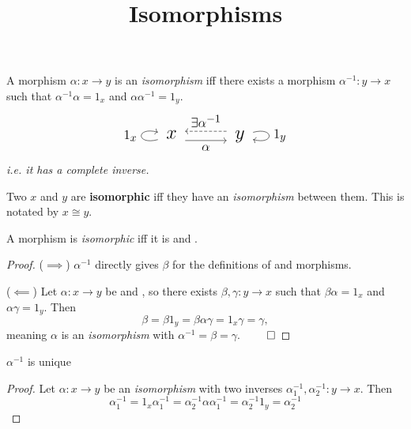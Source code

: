 \documentclass{atomic}
\title{Isomorphisms}
\begin{document}
    \pagestyle{plain}  \noindent
    A morphism $\alpha : x \to y$  is an \textit{isomorphism} iff there exists a morphism $\alpha^{-1} : y \to x$ such that $\alpha^{-1}\alpha = 1_{x}$ and $\alpha\alpha^{-1} = 1_{y}$.
    $$\LARGE\begin{tikzcd}
        \arrow[loop left, "1_x"] x \arrow[r, shift right, swap, "\alpha"] & y \arrow[l, shift right, swap, dashed, "\exists \alpha^{-1}"] \arrow[loop right, "1_y"]
    \end{tikzcd}$$
    \textit{i.e. it has a complete inverse.}

    \begin{definition}[Isomorphic]
        Two  $x$ and $y$ are \textbf{isomorphic} iff they have an \textit{isomorphism} between them. This is notated by $x \cong y$.
    \end{definition}


\begin{theorem}
    A morphism is \textit{isomorphic} iff it is  and .
\end{theorem}
\begin{proof}
    ($\implies$)
    $\alpha^{-1}$ directly gives $\beta$ for the definitions of  and  morphisms.

    ($\impliedby$)
    Let $\alpha :x \to y$ be  and , so there exists $\beta,\gamma : y \to x$ such that $\beta\alpha = 1_{x}$ and $\alpha\gamma = 1_{y}$. Then
    $$\beta = \beta {1}_{y} = \beta\alpha\gamma = 1_{x}\gamma = \gamma,$$
    meaning $\alpha$ is an \textit{isomorphism} with $\alpha^{-1} = \beta = \gamma$. $\qed$
\end{proof}

\begin{theorem}
     $\alpha^{-1}$ is unique
\end{theorem}
\begin{proof}
    Let $\alpha : x \to y$ be an \textit{isomorphism} with two inverses $\alpha_1^{-1},\alpha_2^{-1} : y \to x$. Then
    $$ \alpha_1^{-1} = 1_x\alpha_1^{-1} = \alpha_2^{-1}\alpha\alpha_1^{-1} = \alpha_2^{-1}1_y = \alpha_2^{-1}  $$
\end{proof}
\end{document}
